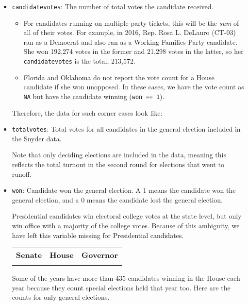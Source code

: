 \documentclass[12pt]{article}
\begin{document}
\begin{itemize}[leftmargin=*]
\item \texttt{candidatevotes}: The number of total votes the candidate received. 
\begin{itemize}
\item For candidates running on multiple party tickets, this will be the \emph{sum} of all of their votes.  For example, in 2016, Rep. Rosa L. DeLauro (CT-03) ran as a Democrat and also ran as a Working Families Party candidate. She won 192,274 votes in the former and 21,298 votes in the latter, so her \texttt{candidatevotes} is the total, 213,572.
\item  Florida and Oklahoma do not report the vote count for a House candidate if she won unopposed. In these cases, we have the vote count as \texttt{NA} but have the candidate winning (\texttt{won == 1}).
\end{itemize}

Therefore, the data for such corner cases look like:

\begin{table}[!h]
\centering
\footnotesize

\end{table}

\item \texttt{totalvotes}: Total votes for all candidates in the general election included in the Snyder data. 

Note that only deciding elections are included in the data, meaning this reflects the total turnout in the second round for elections that went to runoff. 

\item \texttt{won}: Candidate won the general election. A 1 means the candidate won the general election, and a 0 means the candidate lost the general election. 

Presidential candidates win electoral college votes at the state level, but only win office with a majority of the college votes. Because of this ambiguity, we have left this variable missing for Presidential candidates.

    \begin{tabularx}{\linewidth}{CCC}
    \textbf{Senate} & \textbf{House} & \textbf{Governor}\\
     &  & 
    \end{tabularx}

Some of the years have more than 435 candidates winning in the House each year because they count special elections held that year too. Here are the counts for only general elections.


\end{itemize}
\end{document}
